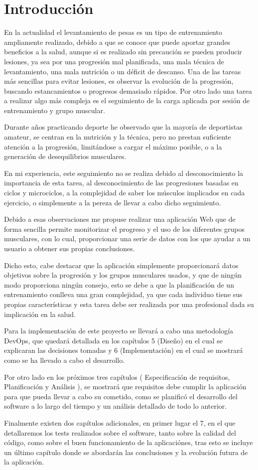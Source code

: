 \chapter{Introducción}
En la actualidad el levantamiento de pesas es un tipo de entrenamiento ampliamente realizado, debido a que se conoce que puede aportar grandes beneficios a la salud, aunque si es realizado sin precaución se pueden producir lesiones, ya sea por una progresión mal planificada, una mala técnica de levantamiento, una mala nutrición o un déficit de descanso. Una de las tareas más sencillas para evitar lesiones, es observar la evolución de la progresión, buscando estancamientos o progresos demasiado rápidos. Por otro lado una tarea a realizar algo más compleja es el seguimiento de la carga aplicada por sesión de entrenamiento y grupo muscular.

Durante años practicando deporte he observado que la mayoría de deportistas amateur, se centran en la nutrición y la técnica, pero no prestan suficiente atención a la progresión, limitándose a cargar el máximo posible, o a la generación de desequilibrios musculares. 

En mi experiencia, este seguimiento no se realiza debido al desconocimiento la importancia de esta tarea, al desconocimiento de las progresiones basadas en ciclos y microciclos, a la complejidad de saber los músculos implicados en cada ejercicio, o simplemente a la pereza de llevar a cabo dicho seguimiento.

Debido a esas observaciones me propuse realizar una aplicación Web que de forma sencilla permite monitorizar el progreso y el uso de los diferentes grupos musculares, con lo cual, proporcionar una serie de datos con los que ayudar a un usuario a obtener sus propias conclusiones.

Dicho esto, cabe destacar que la aplicación simplemente proporcionará datos objetivos sobre la progresión y los grupos musculares usados, y que de ningún modo proporciona ningún consejo, esto se debe a que la planificación de un entrenamiento conlleva una gran complejidad, ya que cada individuo tiene sus propias características y esta tarea debe ser realizada por una profesional dada su implicación en la salud.

Para la implementación de este proyecto se llevará a cabo una metodología DevOps, que quedará detallada en los capítulos 5 (Diseño) en el cual se explicaran las decisiones tomadas y 6 (Implementación) en el cual se mostrará como se ha llevado a cabo el desarrollo.

Por otro lado en los próximos tres capítulos ( Especificación de requisitos, Planificación y Análisis ), se mostrará que requisitos debe cumplir la aplicación para que pueda llevar a cabo su cometido, como se planificó el desarrollo del software a lo largo del tiempo y un análisis detallado de todo lo anterior.

Finalmente existen dos capítulos adicionales, en primer lugar el 7, en el que detallaremos los tests realizados sobre el software, tanto sobre la calidad del código, como sobre el buen funcionamiento de la aplicaciónes, tras esto se incluye un último capítulo donde se abordarán las conclusiones y la evolución futura de la aplicación.
